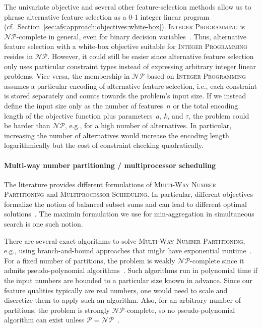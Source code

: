 \documentclass{article}
\theoremstyle{definition}
\begin{document}
The univariate objective and several other feature-selection methods allow us to phrase alternative feature selection as a 0-1 integer linear program (cf.~Section~\ref{sec:afs:approach:objectives:white-box}).
\textsc{Integer Programming} is $\mathcal{NP}$-complete in general, even for binary decision variables~\cite{garey2003computers, karp1972reducibility}.
Thus, alternative feature selection with a white-box objective suitable for \textsc{Integer Programming} resides in $\mathcal{NP}$.
However, it could still be easier since alternative feature selection only uses particular constraint types instead of expressing arbitrary integer linear problems.
Vice versa, the membership in $\mathcal{NP}$ based on \textsc{Integer Programming} assumes a particular encoding of alternative feature selection, i.e., each constraint is stored separately and counts towards the problem's input size.
If we instead define the input size only as the number of features~$n$ or the total encoding length of the objective function plus parameters~$a$, $k$, and $\tau$, the problem could be harder than $\mathcal{NP}$, e.g., for a high number of alternatives.
In particular, increasing the number of alternatives would increase the encoding length logarithmically but the cost of constraint checking quadratically.

\paragraph{Multi-way number partitioning / multiprocessor scheduling}

The literature provides different formulations of \textsc{Multi-Way Number Partitioning} and \textsc{Multiprocessor Scheduling}.
In particular, different objectives formalize the notion of balanced subset sums and can lead to different optimal solutions~\cite{korf2010objective, lawrinenko2017identical}.
The maximin formulation we use for min-aggregation in simultaneous search is one such notion.

There are several exact algorithms to solve \textsc{Multi-Way Number Partitioning}, e.g., using branch-and-bound approaches that might have exponential runtime~\cite{haouari2008maximizing, schreiber2018optimal, walter2017improved}.
For a fixed number of partitions, the problem is weakly $\mathcal{NP}$-complete since it admits pseudo-polynomial algorithms~\cite{garey2003computers, korf2009multi}.
Such algorithms run in polynomial time if the input numbers are bounded to a particular size known in advance.
Since our feature qualities typically are real numbers, one would need to scale and discretize them to apply such an algorithm.
Also, for an arbitrary number of partitions, the problem is strongly $\mathcal{NP}$-complete, so no pseudo-polynomial algorithm can exist unless $\mathcal{P}=\mathcal{NP}$~\cite{garey2003computers}.
\end{document}
